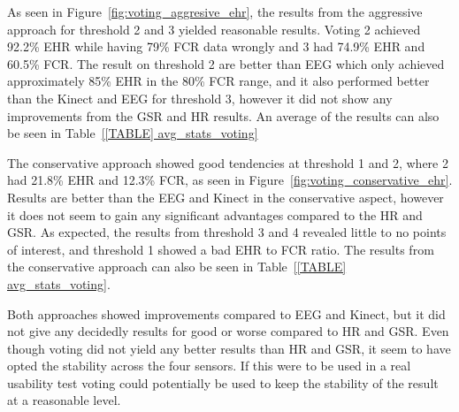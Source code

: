 As seen in Figure~\ref{fig:voting_aggresive_ehr}, the results from the aggressive approach for threshold 2 and 3 yielded reasonable results.
Voting 2 achieved 92.2\% EHR while having 79\% FCR data wrongly and 3 had 74.9\% EHR and 60.5\% FCR.
The result on threshold 2 are better than EEG which only achieved approximately 85\% EHR in the 80\% FCR range, and it
also performed better than the Kinect and EEG for threshold 3, however it did not show any improvements from the GSR and
HR results.
An average of the results can also be seen in Table~\ref{[TABLE] avg_stats_voting}

The conservative approach showed good tendencies at threshold 1 and 2, where 2 had 21.8\% EHR and 12.3\% FCR, as seen in Figure~\ref{fig:voting_conservative_ehr}.
Results are better than the EEG and Kinect in the conservative aspect, however it does not seem to gain any significant advantages compared to the HR and GSR.
As expected, the results from threshold 3 and 4 revealed little to no points of interest, and threshold 1 showed a bad EHR to FCR ratio. 
The results from the conservative approach can also be seen in Table~\ref{[TABLE] avg_stats_voting}.

Both approaches showed improvements compared to EEG and Kinect, but it did not give any decidedly results for good or worse compared
to HR and GSR.
Even though voting did not yield any better results than HR and GSR, it seem to have opted the stability across the four sensors. If this were to be used in a real usability test voting could potentially be used to keep the stability of the result at a reasonable level. 
